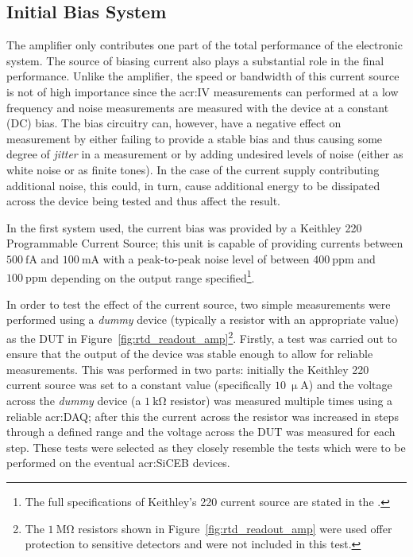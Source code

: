 \subsection{Initial Bias System}
\label{ssec:bias_prelim} 
The amplifier only contributes one part of the total performance of the electronic system. The source of biasing current also plays a substantial role in the final performance. Unlike the amplifier, the speed or bandwidth of this current source is not of high importance since the \gls{acr:IV} measurements can performed at a low frequency and noise measurements are measured with the device at a constant (DC) bias. The bias circuitry can, however, have a negative effect on measurement by either failing to provide a stable bias and thus causing some degree of \textit{jitter} in a measurement or by adding undesired levels of noise (either as white noise or as finite tones). In the case of the current supply contributing additional noise, this could, in turn, cause additional energy to be dissipated across the device being tested and thus affect the result.
\par 
In the first system used, the current bias was provided by a Keithley 220 Programmable Current Source; this unit is capable of providing currents between $500~\mathrm{fA}$ and $100~\mathrm{mA}$ with a peak-to-peak noise level of between $400~\mathrm{ppm}$ and $100~\mathrm{ppm}$ depending on the output range specified\footnote{The full specifications of Keithley's 220 current source are stated in the \textcite{Keithley220DS}.}.
\par 
In order to test the effect of the current source, two simple measurements were performed using a \textit{dummy} device (typically a resistor with an appropriate value) as the DUT in Figure~\ref{fig:rtd_readout_amp}\footnote{The $1~\mathrm{M\Omega}$ resistors shown in Figure~\ref{fig:rtd_readout_amp} were used offer protection to sensitive detectors and were not included in this test.}. Firstly, a test was carried out to ensure that the output of the device was stable enough to allow for reliable measurements. This was performed in two parts: initially the Keithley 220 current source was set to a constant value (specifically $10~\mathrm{\upmu A}$) and the voltage across the \textit{dummy} device (a $1~\mathrm{k\Omega}$ resistor) was measured multiple times using a reliable \gls{acr:DAQ}; after this the current across the resistor was increased in steps through a defined range and the voltage across the DUT was measured for each step. These tests were selected as they closely resemble the tests which were to be performed on the eventual \gls{acr:SiCEB} devices.
